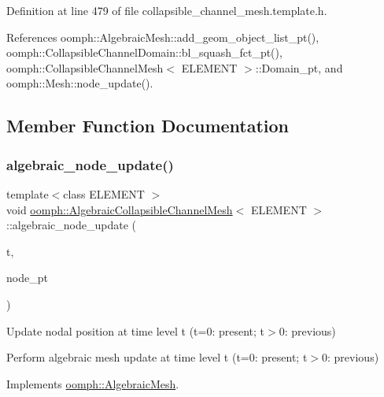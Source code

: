 Definition at line 479 of file collapsible\+\_\+channel\+\_\+mesh.\+template.\+h.



References oomph\+::\+Algebraic\+Mesh\+::add\+\_\+geom\+\_\+object\+\_\+list\+\_\+pt(), oomph\+::\+Collapsible\+Channel\+Domain\+::bl\+\_\+squash\+\_\+fct\+\_\+pt(), oomph\+::\+Collapsible\+Channel\+Mesh$<$ E\+L\+E\+M\+E\+N\+T $>$\+::\+Domain\+\_\+pt, and oomph\+::\+Mesh\+::node\+\_\+update().



\subsection{Member Function Documentation}
\mbox{\label{classoomph_1_1AlgebraicCollapsibleChannelMesh_ae1ea6d9baa12e2ca87d21d4370f41870}} 
\subsubsection{\texorpdfstring{algebraic\+\_\+node\+\_\+update()}{algebraic\_node\_update()}}
{\footnotesize\ttfamily template$<$class E\+L\+E\+M\+E\+NT $>$ \\
void \hyperlink{classoomph_1_1AlgebraicCollapsibleChannelMesh}{oomph\+::\+Algebraic\+Collapsible\+Channel\+Mesh}$<$ E\+L\+E\+M\+E\+NT $>$\+::algebraic\+\_\+node\+\_\+update (\begin{DoxyParamCaption}\item[{const unsigned \&}]{t,  }\item[{\hyperlink{classoomph_1_1AlgebraicNode}{Algebraic\+Node} $\ast$\&}]{node\+\_\+pt }\end{DoxyParamCaption})\hspace{0.3cm}{\ttfamily [virtual]}}



Update nodal position at time level t (t=0\+: present; t$>$0\+: previous) 

Perform algebraic mesh update at time level t (t=0\+: present; t$>$0\+: previous) 

Implements \hyperlink{classoomph_1_1AlgebraicMesh_ab01d6f93354f3c4e5c9d1f0a5885a65b}{oomph\+::\+Algebraic\+Mesh}.



